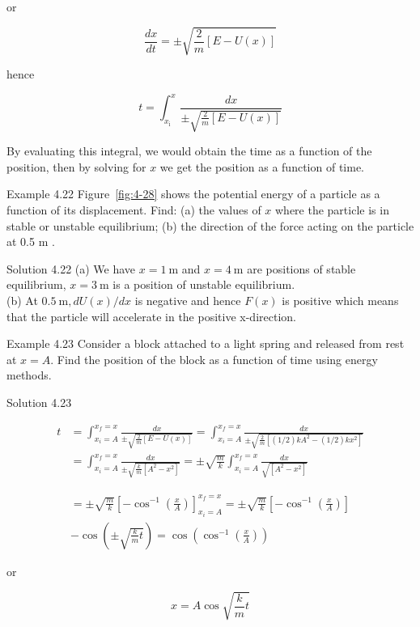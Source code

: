 \documentclass[10pt]{article}
\numberwithin{equation}{section}
\begin{document}
or

$$
\frac{d x}{d t}= \pm \sqrt{\frac{2}{m}[E-U(x)]}
$$

hence

$$
t=\int_{x_{\mathrm{i}}}^{x} \frac{d x}{ \pm \sqrt{\frac{2}{m}[E-U(x)]}}
$$

By evaluating this integral, we would obtain the time as a function of the position, then by solving for $x$ we get the position as a function of time.

Example 4.22 Figure~\ref{fig:4-28} shows the potential energy of a particle as a function of its displacement. Find: (a) the values of $x$ where the particle is in stable or unstable equilibrium; (b) the direction of the force acting on the particle at 0.5 m .

Solution 4.22 (a) We have $x=1 \mathrm{~m}$ and $x=4 \mathrm{~m}$ are positions of stable equilibrium, $x=3 \mathrm{~m}$ is a position of unstable equilibrium.\\
(b) At $0.5 \mathrm{~m}, d U(x) / d x$ is negative and hence $F(x)$ is positive which means that the particle will accelerate in the positive x-direction.

Example 4.23 Consider a block attached to a light spring and released from rest at $x=A$. Find the position of the block as a function of time using energy methods.

Solution 4.23

$$
\begin{aligned}
t & =\int_{x_{i}=A}^{x_{f}=x} \frac{d x}{ \pm \sqrt{\frac{2}{m}[E-U(x)]}}=\int_{x_{i}=A}^{x_{f}=x} \frac{d x}{ \pm \sqrt{\frac{2}{m}\left[(1 / 2) k A^{2}-(1 / 2) k x^{2}\right]}} \\
& =\int_{x_{i}=A}^{x_{f}=x} \frac{d x}{ \pm \sqrt{\frac{k}{m}\left[A^{2}-x^{2}\right]}}= \pm \sqrt{\frac{m}{k}} \int_{x_{i}=A}^{x_{f}=x} \frac{d x}{\sqrt{\left[A^{2}-x^{2}\right]}}
\end{aligned}
$$

$$
\begin{gathered}
= \pm \sqrt{\frac{m}{k}}\left[-\cos ^{-1}\left(\frac{x}{A}\right)\right]_{x_{i}=A}^{x_{f}=x}= \pm \sqrt{\frac{m}{k}}\left[-\cos ^{-1}\left(\frac{x}{A}\right)\right] \\
-\cos \left( \pm \sqrt{\frac{k}{m} t}\right)=\cos \left(\cos ^{-1}\left(\frac{x}{A}\right)\right)
\end{gathered}
$$

or

$$
x=A \cos \sqrt{\frac{k}{m} t}
$$
\end{document}
